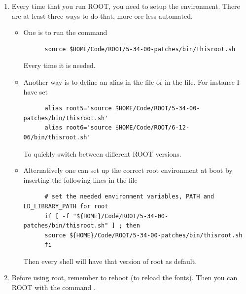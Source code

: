 \begin{enumerate}[resume]
\item Every time that you run ROOT, you need to setup the
  environment. There are at least three ways to do that, more ore less
  automated.
  \begin{itemize}
  \item One is to run the command%
\begin{lstlisting}
      source $HOME/Code/ROOT/5-34-00-patches/bin/thisroot.sh
\end{lstlisting}
    Every time it is needed.
  \item Another way is to define an alias in the
     file or in the 
    file. For instance I have set
\begin{lstlisting}
      alias root5='source $HOME/Code/ROOT/5-34-00-patches/bin/thisroot.sh'
      alias root6='source $HOME/Code/ROOT/6-12-06/bin/thisroot.sh'
\end{lstlisting}
    To quickly switch between different ROOT versions.
  \item Alternatively one can set up the correct root environment at
    boot by inserting the following lines in the 
    file
\begin{lstlisting}
      # set the needed environment variables, PATH and LD_LIBRARY_PATH for root
      if [ -f "${HOME}/Code/ROOT/5-34-00-patches/bin/thisroot.sh" ] ; then
      source ${HOME}/Code/ROOT/5-34-00-patches/bin/thisroot.sh
      fi
\end{lstlisting}
    Then every shell will have that version of root as default.
  \end{itemize}
\item Before using root, remember to reboot (to reload the
  fonts). Then you can ROOT with the command .
\end{enumerate}

